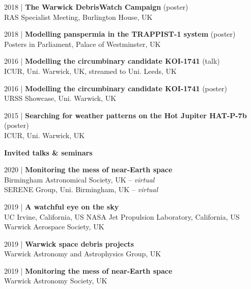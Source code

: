 \documentclass[10pt,a4paper]{altacv}
\begin{document}
\small 2018 | \textbf{The Warwick DebrisWatch Campaign} (poster) \\
RAS Specialist Meeting, Burlington House, UK

\smallskip

\small 2018 | \textbf{Modelling panspermia in the TRAPPIST-1 system} (poster) \\
Posters in Parliament, Palace of Westminster, UK

\smallskip

\small 2016 | \textbf{Modelling the circumbinary candidate KOI-1741} (talk) \\
ICUR, Uni. Warwick, UK, streamed to Uni. Leeds, UK

\smallskip

\small 2016 | \textbf{Modelling the circumbinary candidate KOI-1741} (poster) \\
URSS Showcase, Uni. Warwick, UK

\smallskip

\small 2015 | \textbf{Searching for weather patterns on the Hot Jupiter HAT-P-7b} (poster) \\
ICUR, Uni. Warwick, UK

\divider

\normalsize \textbf{Invited talks \& seminars}

\medskip

\small 2020 | \textbf{Monitoring the mess of near-Earth space} \\
Birmingham Astronomical Society, UK -- \textit{virtual} \\
SERENE Group, Uni. Birmingham, UK -- \textit{virtual}

\smallskip

\small 2019 | \textbf{A watchful eye on the sky} \\
UC Irvine, California, US \linebreak
NASA Jet Propulsion Laboratory, California, US \linebreak
Warwick Aerospace Society, UK 

\smallskip

\small 2019 | \textbf{Warwick space debris projects} \\
Warwick Astronomy and Astrophysics Group, UK

\smallskip

\small 2019 | \textbf{Monitoring the mess of near-Earth space} \\
Warwick Astronomy Society, UK

\smallskip
\end{document}
